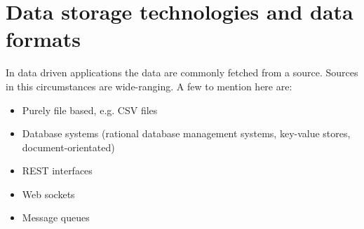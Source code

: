 \section{Data storage technologies and data formats\label{sec:storage}}

In data driven applications the data are commonly fetched from a source. Sources in this circumstances are wide-ranging. A few to mention here are:
\begin{itemize}
  \item Purely file based, e.g. CSV files
  \item Database systems (rational database management systems, key-value stores, document-orientated)
  \item REST interfaces
  \item Web sockets
  \item Message queues\\
\end{itemize}

